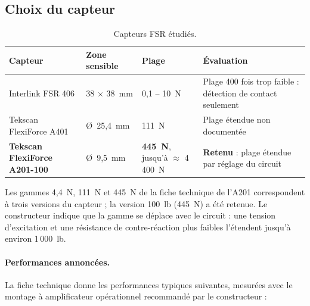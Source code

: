 \subsection{Choix du capteur}

\begin{table}[H]
\centering
\begin{tabularx}{\textwidth}{@{}lllX@{}}
\toprule
\textbf{Capteur} & \textbf{Zone sensible} & \textbf{Plage} & \textbf{Évaluation} \\
\midrule
Interlink FSR 406 & 38 $\times$ 38~mm & 0,1 -- 10~N & Plage 400 fois trop faible : détection de contact seulement \\
Tekscan FlexiForce A401 & Ø~25,4~mm & 111~N & Plage étendue non documentée \\
\textbf{Tekscan FlexiForce A201-100} & Ø~9,5~mm & \textbf{445~N}, jusqu'à $\approx$ 4\,400~N & \textbf{Retenu} : plage étendue par réglage du circuit \\
\bottomrule
\end{tabularx}
\caption{Capteurs FSR étudiés.}
\end{table}

Les gammes 4,4~N, 111~N et 445~N de la fiche technique de l'A201 correspondent à trois versions du capteur ; la version 100~lb (445~N) a été retenue. Le constructeur indique que la gamme se déplace avec le circuit : une tension d'excitation et une résistance de contre-réaction plus faibles l'étendent jusqu'à environ 1\,000~lb.

\paragraph{Performances annoncées.} La fiche technique donne les performances typiques suivantes, mesurées avec le montage à amplificateur opérationnel recommandé par le constructeur :

